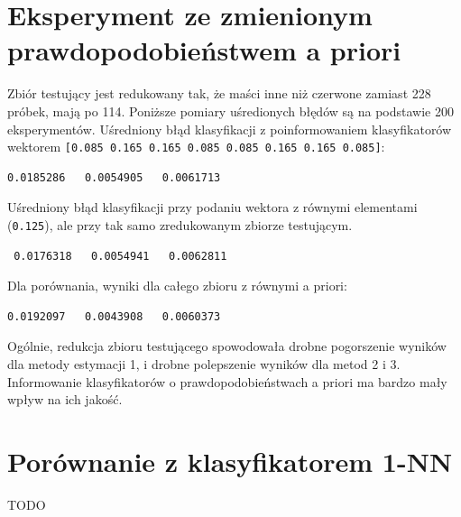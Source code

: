 \documentclass[a4paper]{article}
\begin{document}
\section{Eksperyment ze zmienionym prawdopodobieństwem a priori}
Zbiór testujący jest redukowany tak, że maści inne niż czerwone zamiast 228 próbek, mają po 114.
Poniższe pomiary uśredionych błędów są na podstawie 200 eksperymentów.
Uśredniony błąd klasyfikacji z poinformowaniem klasyfikatorów wektorem \texttt{[0.085 0.165 0.165 0.085 0.085 0.165 0.165 0.085]}:
\begin{verbatim}
0.0185286   0.0054905   0.0061713
\end{verbatim}
Uśredniony błąd klasyfikacji przy podaniu wektora z równymi elementami (\texttt{0.125}),
ale przy tak samo zredukowanym zbiorze testującym.
\begin{verbatim}
 0.0176318   0.0054941   0.0062811
\end{verbatim}
Dla porównania, wyniki dla całego zbioru z równymi a priori:
\begin{verbatim}
0.0192097   0.0043908   0.0060373
\end{verbatim}
Ogólnie, redukcja zbioru testującego spowodowała drobne pogorszenie wyników dla metody estymacji 1,
i drobne polepszenie wyników dla metod 2 i 3.
Informowanie klasyfikatorów o prawdopodobieństwach a priori ma bardzo mały wpływ na ich jakość.


\section{Porównanie z klasyfikatorem 1-NN}
TODO
\end{document}
